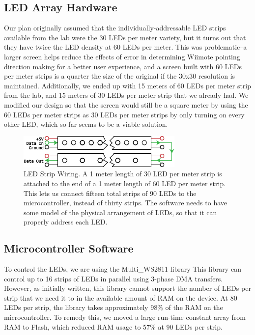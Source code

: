 \documentclass{tufte-handout}
\begin{document}
\subsection{LED Array Hardware}
Our plan originally assumed that the individually-addressable LED strips
available from the lab were
the 30 LEDs per meter variety, but it turns out that they have twice the LED
density at 60 LEDs per meter. This was problematic--a larger screen helps
reduce the effects of error in determining Wiimote pointing direction making
for a better user experience, and a
screen built with 60 LEDs per meter strips is a quarter the size of the original
if the 30x30 resolution is maintained. 
Additionally, we ended up with 15
meters of 60 LEDs per meter strip from the lab, and 15 meters of 30 LEDs per
meter strip that we already had. 
We modified our design so that the screen
would still be a square meter by using the 60 LEDs per meter strips as 30 LEDs
per meter strips by only turning on every other LED, which so far seems to be
a viable solution.
\begin{figure}
    \includegraphics{Wiring_Diagram.png}
    \caption{LED Strip Wiring. A 1 meter length of 30 LED per meter strip is
    attached to the end of a 1 meter length of 60 LED per meter strip. This
lets us connect fifteen total strips of 90 LEDs to the microcontroller,
instead of thirty strips. The software needs to have some model of the
physical arrangement of LEDs, so that it can properly address each LED.}
\end{figure}

\subsection{Microcontroller Software}
To control the LEDs, we are using the Multi\_WS2811 library This library can control up to 16 strips of LEDs in
parallel using 3-phase DMA transfers. However, as initially written, this library cannot support
the number of LEDs per strip that we need it to in the available amount of RAM
on the device. At 80 LEDs per strip, the library takes approximately 98\% of
the RAM on the microcontroller. To remedy this, we moved a large run-time
constant array from RAM to Flash, which reduced RAM usage to 57\% at 90 LEDs per strip.
\end{document}
